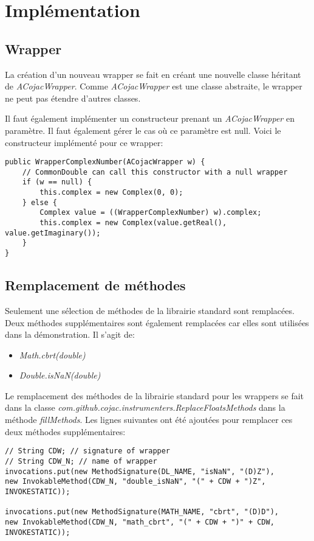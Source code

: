 \section{Implémentation}

\subsection{Wrapper}

La création d'un nouveau wrapper se fait en créant une nouvelle classe héritant de \textit{ACojacWrapper}. Comme \textit{ACojacWrapper} est une classe abstraite, le wrapper ne peut pas étendre d'autres classes.

Il faut également implémenter un constructeur prenant un \textit{ACojacWrapper} en paramètre. Il faut également gérer le cas où ce paramètre est null. Voici le constructeur implémenté pour ce wrapper:

\begin{verbatim}
public WrapperComplexNumber(ACojacWrapper w) {
    // CommonDouble can call this constructor with a null wrapper
    if (w == null) {
        this.complex = new Complex(0, 0);
    } else {
        Complex value = ((WrapperComplexNumber) w).complex;
        this.complex = new Complex(value.getReal(), value.getImaginary());
    }
}
\end{verbatim}

\subsection{Remplacement de méthodes}

Seulement une sélection de méthodes de la librairie standard sont remplacées. Deux méthodes supplémentaires sont également remplacées car elles sont utilisées dans la démonstration. Il s'agit de:
\begin{itemize}
    \item \textit{Math.cbrt(double)}
    \item \textit{Double.isNaN(double)}
\end{itemize}

Le remplacement des méthodes de la librairie standard pour les wrappers se fait dans la classe \textit{com.github.cojac.instrumenters.ReplaceFloatsMethods} dans la méthode \textit{fillMethods}. Les lignes suivantes ont été ajoutées pour remplacer ces deux méthodes supplémentaires:

\begin{verbatim}
// String CDW; // signature of wrapper
// String CDW_N; // name of wrapper
invocations.put(new MethodSignature(DL_NAME, "isNaN", "(D)Z"),
new InvokableMethod(CDW_N, "double_isNaN", "(" + CDW + ")Z", INVOKESTATIC));

invocations.put(new MethodSignature(MATH_NAME, "cbrt", "(D)D"),
new InvokableMethod(CDW_N, "math_cbrt", "(" + CDW + ")" + CDW, INVOKESTATIC));
\end{verbatim}

